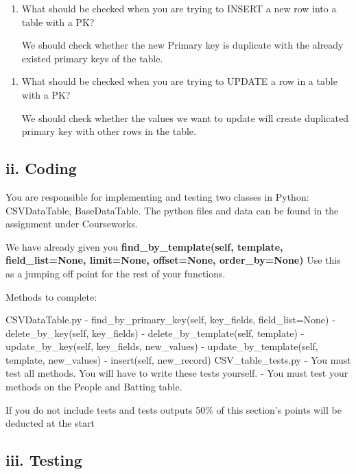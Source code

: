\documentclass[11pt]{article}
\begin{document}
    \begin{enumerate}
\def\labelenumi{\arabic{enumi}.}
\setcounter{enumi}{1}
\item
  What should be checked when you are trying to INSERT a new row into a
  table with a PK?

  We should check whether the new Primary key is duplicate with the
  already existed primary keys of the table.
\end{enumerate}

    \begin{enumerate}
\def\labelenumi{\arabic{enumi}.}
\setcounter{enumi}{2}
\item
  What should be checked when you are trying to UPDATE a row in a table
  with a PK?

  We should check whether the values we want to update will create
  duplicated primary key with other rows in the table.
\end{enumerate}

    \hypertarget{ii.-coding}{%
\subsection{ii. Coding}\label{ii.-coding}}

You are responsible for implementing and testing two classes in Python:
CSVDataTable, BaseDataTable. The python files and data can be found in
the assignment under Courseworks.

We have already given you \textbf{find\_by\_template(self, template,
field\_list=None, limit=None, offset=None, order\_by=None)} Use this as
a jumping off point for the rest of your functions.

Methods to complete:

CSVDataTable.py - find\_by\_primary\_key(self, key\_fields,
field\_list=None) - delete\_by\_key(self, key\_fields) -
delete\_by\_template(self, template) - update\_by\_key(self,
key\_fields, new\_values) - update\_by\_template(self, template,
new\_values) - insert(self, new\_record) CSV\_table\_tests.py - You must
test all methods. You will have to write these tests yourself. - You
must test your methods on the People and Batting table.

If you do not include tests and tests outputs 50\% of this section's
points will be deducted at the start

\hypertarget{iii.-testing}{%
\subsection{iii. Testing}\label{iii.-testing}}
\end{document}
